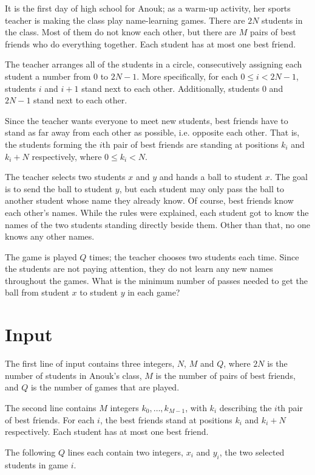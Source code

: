 
It is the first day of high school for Anouk; as a warm-up activity, her sports teacher is making the class play name-learning games.
There are $2N$ students in the class. Most of them do not know each other, but there are $M$ pairs of best friends who do everything together. Each student has at most one best friend.

The teacher arranges all of the students in a circle, consecutively assigning each student a number from $0$ to $2N - 1$.
More specifically, for each $0 \leq i < 2N - 1$, students $i$ and $i + 1$ stand next to each other.
Additionally, students $0$ and $2N - 1$ stand next to each other.

Since the teacher wants everyone to meet new students, best friends have to stand as far away from each other as possible, i.e. opposite each other. That is, the students forming the $i$th pair of best friends are standing at positions $k_i$ and $k_i + N$ respectively, where $0 \leq k_i < N$.

The teacher selects two students $x$ and $y$ and hands a ball to student $x$.
The goal is to send the ball to student $y$, but each student may only pass the ball to another student whose name they already know.
Of course, best friends know each other's names. While the rules were explained, each student got to know the names of the two students standing directly beside them.
Other than that, no one knows any other names.

The game is played $Q$ times; the teacher chooses two students each time. Since the students are not paying attention, they do not learn any new names throughout the games.
What is the minimum number of passes needed to get the ball from student $x$ to student $y$ in each game?

\section*{Input}
The first line of input contains three integers, $N$, $M$ and $Q$, where $2N$ is the number of students in Anouk's class, $M$ is the number of pairs of best friends, and $Q$ is the number of games that are played.

The second line contains $M$ integers $k_0, \ldots, k_{M-1}$, with $k_i$ describing the $i$th pair of best friends. For each $i$, the best friends stand at positions $k_i$ and $k_i + N$ respectively.
Each student has at most one best friend.

The following $Q$ lines each contain two integers, $x_i$ and $y_i$, the two selected students in game $i$.

